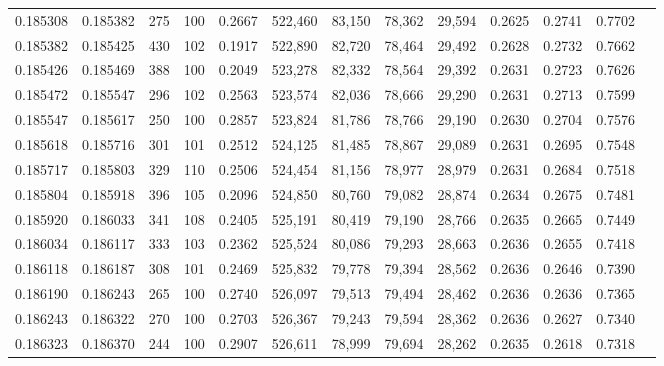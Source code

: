 \begin{tabular}{rrrrrrrrrrrrr}
0.185308 & 0.185382 &   275 & 100 &                                     0.2667 & 522,460 &  83,150 &  78,362 &  29,594 & 0.2625 & 0.2741 & 0.7702 \\
0.185382 & 0.185425 &   430 & 102 &                                     0.1917 & 522,890 &  82,720 &  78,464 &  29,492 & 0.2628 & 0.2732 & 0.7662 \\
0.185426 & 0.185469 &   388 & 100 &                                     0.2049 & 523,278 &  82,332 &  78,564 &  29,392 & 0.2631 & 0.2723 & 0.7626 \\
0.185472 & 0.185547 &   296 & 102 &                                     0.2563 & 523,574 &  82,036 &  78,666 &  29,290 & 0.2631 & 0.2713 & 0.7599 \\
0.185547 & 0.185617 &   250 & 100 &                                     0.2857 & 523,824 &  81,786 &  78,766 &  29,190 & 0.2630 & 0.2704 & 0.7576 \\
0.185618 & 0.185716 &   301 & 101 &                                     0.2512 & 524,125 &  81,485 &  78,867 &  29,089 & 0.2631 & 0.2695 & 0.7548 \\
0.185717 & 0.185803 &   329 & 110 &                                     0.2506 & 524,454 &  81,156 &  78,977 &  28,979 & 0.2631 & 0.2684 & 0.7518 \\
0.185804 & 0.185918 &   396 & 105 &                                     0.2096 & 524,850 &  80,760 &  79,082 &  28,874 & 0.2634 & 0.2675 & 0.7481 \\
0.185920 & 0.186033 &   341 & 108 &                                     0.2405 & 525,191 &  80,419 &  79,190 &  28,766 & 0.2635 & 0.2665 & 0.7449 \\
0.186034 & 0.186117 &   333 & 103 &                                     0.2362 & 525,524 &  80,086 &  79,293 &  28,663 & 0.2636 & 0.2655 & 0.7418 \\
0.186118 & 0.186187 &   308 & 101 &                                     0.2469 & 525,832 &  79,778 &  79,394 &  28,562 & 0.2636 & 0.2646 & 0.7390 \\
0.186190 & 0.186243 &   265 & 100 &                                     0.2740 & 526,097 &  79,513 &  79,494 &  28,462 & 0.2636 & 0.2636 & 0.7365 \\
0.186243 & 0.186322 &   270 & 100 &                                     0.2703 & 526,367 &  79,243 &  79,594 &  28,362 & 0.2636 & 0.2627 & 0.7340 \\
0.186323 & 0.186370 &   244 & 100 &                                     0.2907 & 526,611 &  78,999 &  79,694 &  28,262 & 0.2635 & 0.2618 & 0.7318 \\

\end{tabular}
